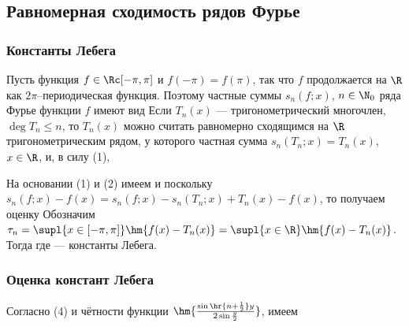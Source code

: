 \documentclass[a4paper]{article}
\begin{document}
\subsection{Равномерная сходимость рядов Фурье}
\subsubsection{Константы Лебега}

Пусть функция $f\in\Rc[-\pi,\pi]$ и $f(-\pi) = f(\pi)$, так что $f$
продолжается на $\R$ как $2\pi$--периодическая функция. Поэтому
частные суммы $s_n(f;x)$, $n\in\N_0$ ряда Фурье функции $f$ имеют
вид  Если
$T_n(x)$ --- тригонометрический многочлен, $\deg T_n\le n$, то
$T_n(x)$ можно считать равномерно сходящимся на $\R$
тригонометрическим рядом, у которого частная сумма $s_n(T_n;x) =
T_n(x)$, $x\in\R$, и, в силу (1), 

На основании (1) и (2) имеем  и поскольку
$s_n(f;x) - f(x) = s_n(f;x) - s_n(T_n;x) + T_n(x) - f(x)$, то
получаем оценку  Обозначим $\tau_n = \supl{x\in[-\pi,\pi]}
\hm{f(x) - T_n(x)} = \supl{x\in\R} \hm{f(x) - T_n(x)}$. Тогда
 где  --- константы Лебега.

\subsubsection{Оценка констант Лебега}

Согласно (4) и чётности функции
$\hm{\frac{\sin\hr{n+\frac12}y}{2\sin\frac{y}2}}$, имеем 
\end{document}
